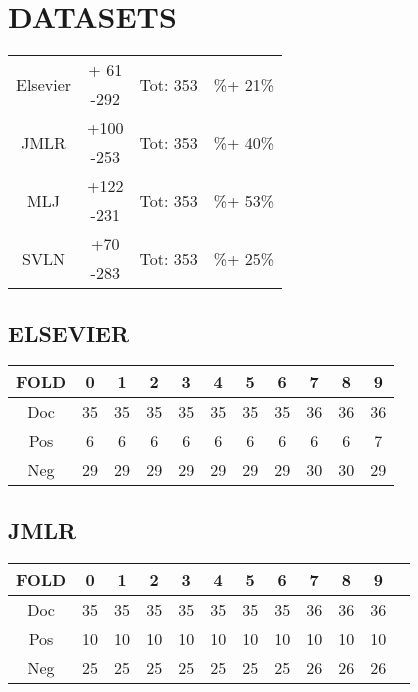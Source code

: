 \section{DATASETS}
\begin{table}[htbp]
	\centering
	\begin{tabular}{c | c | c | c}
		\multirow{2}{*}{Elsevier} & + 61 & \multirow{2}{*}{Tot: 353}& \multirow{2}{*}{\%+ 21\%} \\
		 & -292 &  & \\
		 \hline
		 \multirow{2}{*}{JMLR} & +100 & \multirow{2}{*}{Tot: 353} & \multirow{2}{*}{\%+ 40\%} \\
		 & -253 & & \\
 		 \hline
 		 \multirow{2}{*}{MLJ} & +122 & \multirow{2}{*}{Tot: 353} & \multirow{2}{*}{\%+ 53\%} \\
 		 & -231 & & \\
 		 \hline
 		 \multirow{2}{*}{SVLN} & +70 & \multirow{2}{*}{Tot: 353} & \multirow{2}{*}{\%+ 25\%} \\
 		 & -283 & & \\
		\end{tabular}%
	\label{tab:}
\end{table}
\subsection{ELSEVIER}
\begin{table}[htbp]
	\centering
		\begin{tabular}{c | cccccccccc}
			FOLD &  0 &  1 &  2 &  3 &  4 &  5 &  6 &  7 &  8 &  9 \\ \hline
			Doc  & 35 & 35 & 35 & 35 & 35 & 35 & 35 & 36 & 36 & 36 \\
			Pos  & 6  & 6  &  6 &  6 &  6 &  6 &  6 &  6 &  6 &  7 \\
			Neg  & 29 & 29 & 29 & 29 & 29 & 29 & 29 & 30 & 30 & 29 \\
		\end{tabular}%
	\label{tab:Elsevier}
\end{table}
\subsection{JMLR}
\begin{table}[htbp]
	\centering
		\begin{tabular}{c | ccccccccccc}
			FOLD &  0 &  1 &  2 &  3 &  4 &  5 &  6 &  7 &  8 &  9 \\ \hline
			Doc  & 35 & 35 & 35 & 35 & 35 & 35 & 35 & 36 & 36 & 36 \\
			Pos  & 10  & 10  &  10 &  10 &  10 &  10 &  10 &  10 &  10 &  10 \\
			Neg  & 25 & 25 & 25 & 25 & 25 & 25 & 25 & 26 & 26 & 26 \\
		\end{tabular}%
	\label{tab:JMLR}
\end{table}
